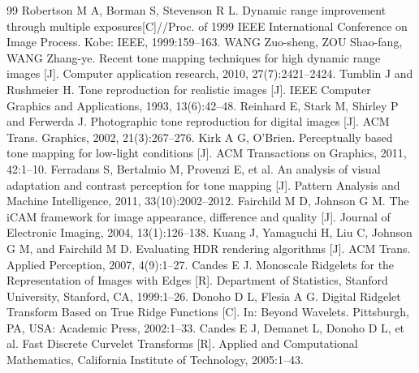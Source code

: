 \documentclass[11pt]{article}
\begin{document}
\begin{thebibliography}{99}
 Robertson M A, Borman S, Stevenson R L. Dynamic range improvement through multiple exposures[C]//Proc. of 1999 IEEE International Conference on Image Process. Kobe: IEEE, 1999:159--163.
 WANG Zuo-sheng, ZOU Shao-fang, WANG Zhang-ye. Recent tone mapping techniques for high dynamic range images [J]. Computer application research, 2010, 27(7):2421--2424.
 Tumblin J and Rushmeier H. Tone reproduction for realistic images [J]. IEEE Computer Graphics and Applications, 1993, 13(6):42--48.
 Reinhard E, Stark M, Shirley P and Ferwerda J. Photographic tone reproduction for digital images [J]. ACM Trans. Graphics, 2002, 21(3):267--276.
 Kirk A G, O'Brien. Perceptually based tone mapping for low-light conditions [J]. ACM Transactions on Graphics, 2011, 42:1--10.
 Ferradans S, Bertalmio M, Provenzi E, et al. An analysis of visual adaptation and contrast perception for tone mapping [J]. Pattern Analysis and Machine Intelligence, 2011, 33(10):2002--2012.
 Fairchild M D, Johnson G M. The iCAM framework for image appearance, difference and quality [J]. Journal of Electronic Imaging, 2004, 13(1):126--138.
 Kuang J, Yamaguchi H, Liu C, Johnson G M, and Fairchild M D. Evaluating HDR rendering algorithms [J]. ACM Trans. Applied Perception, 2007, 4(9):1--27.
 Candes E J. Monoscale Ridgelets for the Representation of Images with Edges [R]. Department of Statistics, Stanford University, Stanford, CA, 1999:1--26.
 Donoho D L, Flesia A G. Digital Ridgelet Transform Based on True Ridge Functions [C]. In: Beyond Wavelets. Pittsburgh, PA, USA: Academic Press, 2002:1--33.
 Candes E J, Demanet L, Donoho D L, et al. Fast Discrete Curvelet Transforms [R]. Applied and Computational Mathematics, California Institute of Technology, 2005:1--43.
\end{thebibliography}
\end{document}
